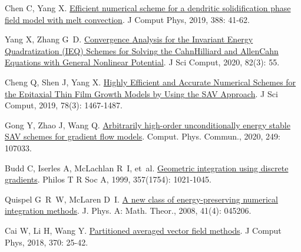 \begin{thebibliography}{79}
    Chen C, Yang X.
    \newblock \href{https://www.sciencedirect.com/science/article/pii/S0021999119302001}{Efficient numerical scheme for a dendritic solidification phase field model with melt convection}\allowbreak[J].
    \newblock J Comput Phys, 2019, 388: 41-62.
    
    Yang X, Zhang G~D.
    \newblock \href{https://doi.org/10.1007/s10915-020-01151-x}{Convergence {{Analysis}} for the {{Invariant Energy Quadratization}} ({{IEQ}}) {{Schemes}} for {{Solving}} the {{Cahn}}{\textendash}{{Hilliard}} and {{Allen}}{\textendash}{{Cahn Equations}} with {{General Nonlinear Potential}}}\allowbreak[J].
    \newblock J Sci Comput, 2020, 82\allowbreak (3): 55.
    
    Cheng Q, Shen J, Yang X.
    \newblock \href{https://doi.org/10.1007/s10915-018-0832-5}{Highly {{Efficient}} and {{Accurate Numerical Schemes}} for the {{Epitaxial Thin Film Growth Models}} by {{Using}} the {{SAV Approach}}}\allowbreak[J].
    \newblock J Sci Comput, 2019, 78\allowbreak (3): 1467-1487.
    
    Gong Y, Zhao J, Wang Q.
    \newblock \href{https://www.sciencedirect.com/science/article/pii/S0010465519303716}{Arbitrarily high-order unconditionally energy stable {{SAV}} schemes for gradient flow models}\allowbreak[J].
    \newblock Comput. Phys. Commun., 2020, 249: 107033.
    
    Budd C, Iserles A, McLachlan R~I, et~al.
    \newblock \href{https://royalsocietypublishing.org/doi/10.1098/rsta.1999.0363}{Geometric integration using discrete gradients}\allowbreak[J].
    \newblock Philos T R Soc A, 1999, 357\allowbreak (1754): 1021-1045.

    Quispel G~R~W, McLaren D~I.
    \newblock \href{https://iopscience.iop.org/article/10.1088/1751-8113/41/4/045206}{A new class of energy-preserving numerical integration methods}\allowbreak[J].
    \newblock J. Phys. A: Math. Theor., 2008, 41\allowbreak (4): 045206.
    
    Cai W, Li H, Wang Y.
    \newblock \href{https://linkinghub.elsevier.com/retrieve/pii/S0021999118303012}{Partitioned averaged vector field methods}\allowbreak[J].
    \newblock J Comput Phys, 2018, 370: 25-42.
    

\end{thebibliography}
